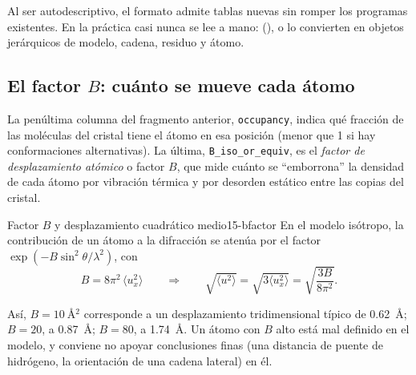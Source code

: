 Al ser autodescriptivo, el formato admite tablas nuevas sin romper los programas existentes. En la práctica casi nunca se lee a mano:  (),  o  lo convierten en objetos jerárquicos de modelo, cadena, residuo y átomo.

\subsection{El factor $B$: cuánto se mueve cada átomo}

La penúltima columna del fragmento anterior, \texttt{occupancy}, indica qué fracción de las moléculas del cristal tiene el átomo en esa posición (menor que 1 si hay conformaciones alternativas). La última, \texttt{B\_iso\_or\_equiv}, es el \emph{factor de desplazamiento atómico} o factor $B$, que mide cuánto se ``emborrona'' la densidad de cada átomo por vibración térmica y por desorden estático entre las copias del cristal.

\begin{teorema}{Factor $B$ y desplazamiento cuadrático medio}{15-bfactor}
En el modelo isótropo, la contribución de un átomo a la difracción se atenúa por el factor $\exp(-B\sin^2\theta/\lambda^2)$, con
\begin{equation}\label{eq:15-bfactor}
B = 8\pi^2\,\langle u_x^2\rangle
\qquad\Longrightarrow\qquad
\sqrt{\langle u^2\rangle} = \sqrt{3\langle u_x^2\rangle}=\sqrt{\frac{3B}{8\pi^2}}.
\end{equation}
\end{teorema}

\begin{simbolos}
\end{simbolos}

Así, $B=\SI{10}{\angstrom^2}$ corresponde a un desplazamiento tridimensional típico de \SI{0,62}{\angstrom}; $B=20$, a \SI{0,87}{\angstrom}; $B=80$, a \SI{1,74}{\angstrom}. Un átomo con $B$ alto está mal definido en el modelo, y conviene no apoyar conclusiones finas (una distancia de puente de hidrógeno, la orientación de una cadena lateral) en él.

